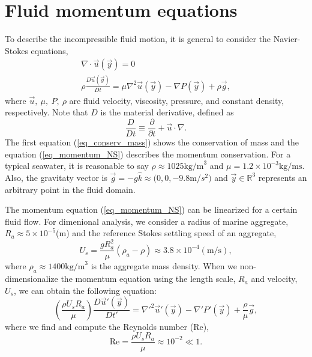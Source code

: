 \section{Fluid momentum equations}
To describe the incompressible fluid motion, it is general to consider the Navier-Stokes equations,
\begin{align}
\nabla \cdot \vec{u}(\vec{y}) = 0 
\label{eq_conserv_mass} \\
\rho \frac{D\vec{u}(\vec{y})}{Dt}
 =\mu \nabla^2 \vec{u}(\vec{y}) - \nabla P(\vec{y}) + \rho  \vec{g} ,
\label{eq_momentum_NS}
\end{align}
where $\vec{u}, \ \mu, \ P, \ \rho$ are fluid velocity, viscosity, pressure, and constant density, respectively. 
Note that $D$ is the material derivative, defined as
\begin{equation}
\frac{D}{Dt} \equiv \frac{\partial}{\partial t} + \vec{u}\cdot \nabla.
\end{equation}
The first equation (\ref{eq_conserv_mass}) shows the conservation of mass and the equation (\ref{eq_momentum_NS}) describes the momentum conservation. 
For a typical seawater, it is reasonable to say $\rho \approx 1025 \text{kg/m}^3$ and $\mu = 1.2 \times 10^{-3}\text{kg}/\text{ms}$.
Also, the gravitaty vector is $\vec{g} = - g\hat{k} \approx (0,0,-9.8$m/$s^2)$ and $\vec{y} \in \mathbb{R}^3$ represents an arbitrary point in the fluid domain. 
\par
 The momentum equation (\ref{eq_momentum_NS}) can be linearized for a certain fluid flow. 
 For dimenional analysis, we consider a radius of marine aggregate, $R_a \approx 5 \times 10^{-5}$(m) and the reference Stokes settling speed of an aggregate,
\begin{equation}
    U_s =  \frac{gR_a^2}{\mu} (\rho_a-\rho) \approx 3.8 \times 10^{-4} ({\text{m/s}}),
	\label{eq_U_s}
\end{equation}
where $\rho_a \approx 1400\text{kg/m}^3$ is the aggregate mass density. 
When we non-dimensionalize the momentum equation using the length scale, $R_a$ and velocity, $U_s$, we can obtain the following equation:
\begin{equation}
	\left(\frac{\rho U_s R_a}{\mu} \right) \frac{D\vec{u}'(\vec{y})}{Dt'}
 = {\nabla'}^2 \vec{u}'(\vec{y}) - \nabla' P'(\vec{y}) + \frac{\rho}{\mu}  \vec{g},
 \label{eq_NS_moment_noD}
\end{equation}
where we find and compute the Reynolds number (Re),
\begin{equation}
	\text{Re} = \frac{\rho U_s R_a}{\mu} \approx 10^{-2}
	\ll 1.
\end{equation}
